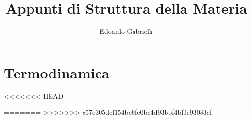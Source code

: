 \documentclass[a4paper]{report}
\author{Edoardo Gabrielli}
\title{Appunti di Struttura della Materia}
\renewcommand{\[}{\begin{equation}}
\renewcommand{\]}{\end{equation}}
\begin{document}
\maketitle
\clearpage
\tableofcontents
\chapter{Termodinamica}










<<<<<<< HEAD




=======
%
>>>>>>> c57e305dcf154bc0fe0bc4d93bbf4bf0c93083ef
\end{document}
